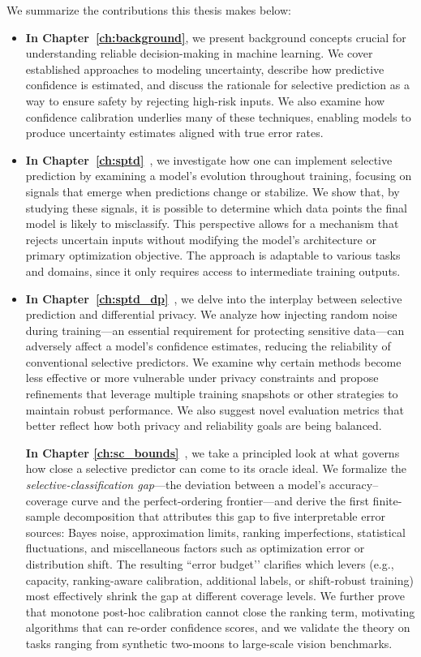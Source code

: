 We summarize the contributions this thesis makes below:
\begin{itemize}
    \item \textbf{In Chapter~\ref{ch:background}}, we present background concepts crucial for understanding reliable decision-making in machine learning. We cover established approaches to modeling uncertainty, describe how predictive confidence is estimated, and discuss the rationale for selective prediction as a way to ensure safety by rejecting high-risk inputs. We also examine how confidence calibration underlies many of these techniques, enabling models to produce uncertainty estimates aligned with true error rates.

    \item \textbf{In Chapter~\ref{ch:sptd}}~\citep{rabanser2022selective}, we investigate how one can implement selective prediction by examining a model’s evolution throughout training, focusing on signals that emerge when predictions change or stabilize. We show that, by studying these signals, it is possible to determine which data points the final model is likely to misclassify. This perspective allows for a mechanism that rejects uncertain inputs without modifying the model’s architecture or primary optimization objective. The approach is adaptable to various tasks and domains, since it only requires access to intermediate training outputs.

    \item \textbf{In Chapter~\ref{ch:sptd_dp}}~\citep{rabanser2023training}, we delve into the interplay between selective prediction and differential privacy. We analyze how injecting random noise during training—an essential requirement for protecting sensitive data—can adversely affect a model's confidence estimates, reducing the reliability of conventional selective predictors. We examine why certain methods become less effective or more vulnerable under privacy constraints and propose refinements that leverage multiple training snapshots or other strategies to maintain robust performance. We also suggest novel evaluation metrics that better reflect how both privacy and reliability goals are being balanced.

    \textbf{In Chapter \ref{ch:sc_bounds}}~\citep{rabanser2025what}, we take a principled look at what governs how close a selective predictor can come to its oracle ideal. We formalize the \emph{selective-classification gap}—the deviation between a model’s accuracy–coverage curve and the perfect-ordering frontier—and derive the first finite-sample decomposition that attributes this gap to five interpretable error sources: Bayes noise, approximation limits, ranking imperfections, statistical fluctuations, and miscellaneous factors such as optimization error or distribution shift. The resulting “error budget’’ clarifies which levers (e.g., capacity, ranking-aware calibration, additional labels, or shift-robust training) most effectively shrink the gap at different coverage levels. We further prove that monotone post-hoc calibration cannot close the ranking term, motivating algorithms that can re-order confidence scores, and we validate the theory on tasks ranging from synthetic two-moons to large-scale vision benchmarks.


\end{itemize}
